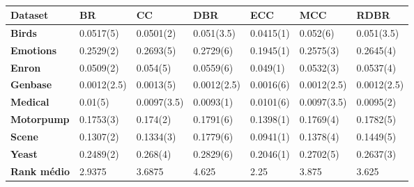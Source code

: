 \begin{table}[\tabmode]
\begin{tabular}{lllllll}
\hline
\textbf{Dataset}    & \textbf{BR} & \textbf{CC} & \textbf{DBR} & \textbf{ECC} & \textbf{MCC} & \textbf{RDBR} \\ \hline
\textbf{Birds}      & 0.0517(5)   & 0.0501(2)   & 0.051(3.5)   & 0.0415(1)    & 0.052(6)     & 0.051(3.5)    \\
\textbf{Emotions}   & 0.2529(2)   & 0.2693(5)   & 0.2729(6)    & 0.1945(1)    & 0.2575(3)    & 0.2645(4)     \\
\textbf{Enron}      & 0.0509(2)   & 0.054(5)    & 0.0559(6)    & 0.049(1)     & 0.0532(3)    & 0.0537(4)     \\
\textbf{Genbase}    & 0.0012(2.5) & 0.0013(5)   & 0.0012(2.5)  & 0.0016(6)    & 0.0012(2.5)  & 0.0012(2.5)   \\
\textbf{Medical}    & 0.01(5)     & 0.0097(3.5) & 0.0093(1)    & 0.0101(6)    & 0.0097(3.5)  & 0.0095(2)     \\
\textbf{Motorpump}  & 0.1753(3)   & 0.174(2)    & 0.1791(6)    & 0.1398(1)    & 0.1769(4)    & 0.1782(5)     \\
\textbf{Scene}      & 0.1307(2)   & 0.1334(3)   & 0.1779(6)    & 0.0941(1)    & 0.1378(4)    & 0.1449(5)     \\
\textbf{Yeast}      & 0.2489(2)   & 0.268(4)    & 0.2829(6)    & 0.2046(1)    & 0.2702(5)    & 0.2637(3)     \\ \hline
\textbf{Rank médio} & 2.9375      & 3.6875      & 4.625        & 2.25         & 3.875        & 3.625         \\ \hline
\end{tabular}
\caption{}
\label{tab:HLj48}
\end{table}